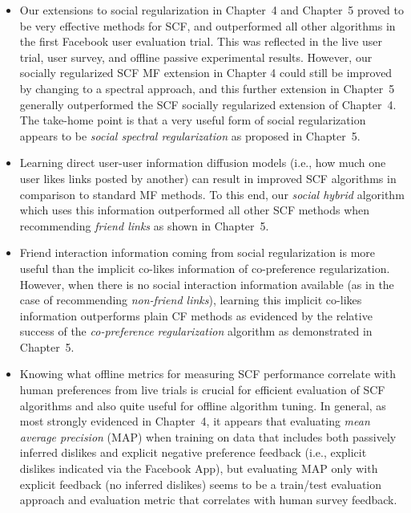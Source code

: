 \begin{itemize}
\item Our extensions to social regularization in Chapter~4 and
Chapter~5 proved to be very effective methods for SCF, and
outperformed all other algorithms in the first Facebook user
evaluation trial.  This was reflected in the live user trial, user
survey, and offline passive experimental results.  However, our
socially regularized SCF MF extension in Chapter 4 could still be
improved by changing to a spectral approach, and this further
extension in Chapter~5 generally outperformed the SCF socially
regularized extension of Chapter~4.  The take-home point is that a very 
useful form of social regularization appears to be \emph{social spectral
regularization} as proposed in Chapter~5.

\item Learning direct user-user information diffusion models (i.e.,
how much one user likes links posted by another) can result in
improved SCF algorithms in comparison to standard MF methods.  To this
end, our \emph{social hybrid} algorithm which uses this information
outperformed all other SCF methods when recommending \emph{friend links} as
shown in Chapter~5.

\item Friend interaction information coming from social regularization
is more useful than the implicit co-likes information of co-preference
regularization. However, when there is no social interaction
information available (as in the case of recommending \emph{non-friend
links}), learning this implicit co-likes information outperforms plain
CF methods as evidenced by the relative success of the
\emph{co-preference regularization} algorithm as demonstrated in
Chapter~5.

\item Knowing what offline metrics for measuring SCF performance
correlate with human preferences from live trials is crucial for
efficient evaluation of SCF algorithms and also quite useful for
offline algorithm tuning.  In general, as most strongly evidenced in
Chapter~4, it appears that evaluating \emph{mean average precision}
(MAP) when training on data that includes both passively inferred
dislikes and explicit negative preference feedback (i.e., explicit
dislikes indicated via the Facebook App), but evaluating MAP only with
explicit feedback (no inferred dislikes) seems to be a train/test
evaluation approach and evaluation metric that correlates with human
survey feedback.

\end{itemize}


